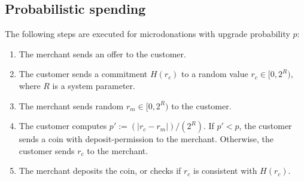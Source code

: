 \documentclass{llncs}
\begin{document}
%
%
%


\subsection{Probabilistic spending}

The following steps are executed for microdonations with upgrade probability $p$:
\begin{enumerate}
  \item The merchant sends an offer to the customer.
  \item The customer sends a commitment $H(r_c)$ to a random
    value $r_c \in [0,2^R)$, where $R$ is a system parameter.
  \item The merchant sends random $r_m \in [0,2^R)$ to the customer.
    \item The customer computes $p' := (|r_c - r_m|) / (2^R)$.
    If $p' < p$, the customer sends a coin with deposit-permission to the merchant.
    Otherwise, the customer sends $r_c$ to the merchant.
  \item The merchant deposits the coin, or checks if $r_c$ is consistent
    with $H(r_c)$.
\end{enumerate}
\end{document}
